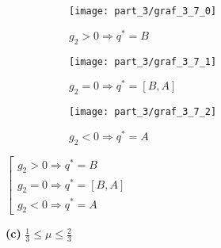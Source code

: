 \begin{flushleft}
	\begin{figure}[H]
    	\centering
     	\begin{subfigure}[b]{0.3 \textwidth}
        	\centering
        	\texttt{[image: part\_3/graf\_3\_7\_0]}
        	\caption{$g_2 > 0 \Rightarrow q^*=B$}
         	\label{fig:y equals x}
     	\end{subfigure}
     	\begin{subfigure}[b]{0.3 \textwidth}
        	\centering
        	\texttt{[image: part\_3/graf\_3\_7\_1]}
        	\caption{$g_2 = 0 \Rightarrow q^*=[B,A]$}
        	\label{fig:three sin x}
     	\end{subfigure}
     	\begin{subfigure}[b]{0.3 \textwidth}
        	\centering
        	\texttt{[image: part\_3/graf\_3\_7\_2]}
        	\caption{$g_2 < 0 \Rightarrow q^*=A$}
        	\label{fig:three sin x}
     	\end{subfigure}
     	\caption{}
	\end{figure}
	
	\begin{center}
		$\left[
		\begin{gathered}
			g_2 > 0 \Rightarrow q^*=B \\
			g_2 = 0 \Rightarrow q^*=[B,A] \\
			g_2 < 0 \Rightarrow q^*=A
		\end{gathered}
		\right.$	
	\end{center}	
	
	\newpage

	\textbf{(c)} $\frac{1}{3} \leqslant \mu \leqslant \frac{2}{3}$
	

\end{flushleft}
